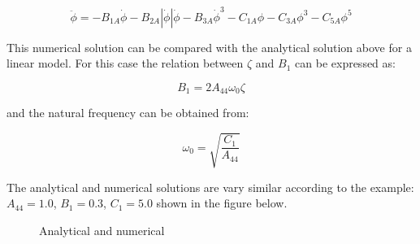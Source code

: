             
    
    \begin{equation}
\ddot{\phi} = - B_{1A} \dot{\phi} - B_{2A} \left|{\dot{\phi}}\right| \dot{\phi} - B_{3A} \dot{\phi}^{3} - C_{1A} \phi - C_{3A} \phi^{3} - C_{5A} \phi^{5}
\label{eq:equation}
\end{equation}

    

    This numerical solution can be compared with the analytical solution
above for a linear model. For this case the relation between \(\zeta\)
and \(B_1\) can be expressed as:
 
            
    
    \begin{equation}
B_{1} = 2 A_{44} \omega_{0} \zeta
\label{eq:equation}
\end{equation}

    

    and the natural frequency can be obtained from:
 
            
    
    \begin{equation}
\omega_{0} = \sqrt{\frac{C_{1}}{A_{44}}}
\label{eq:equation}
\end{equation}

    

    The analytical and numerical solutions are vary similar according to the
example: \(A_{44} = 1.0\), \(B_1 = 0.3\), \(C_1 = 5.0\) shown in the
figure below.

    \begin{figure}
        \begin{center}\end{center}
        \caption{Analytical and numerical}
        \label{fig:analytical_numerical}
    \end{figure}
    
    